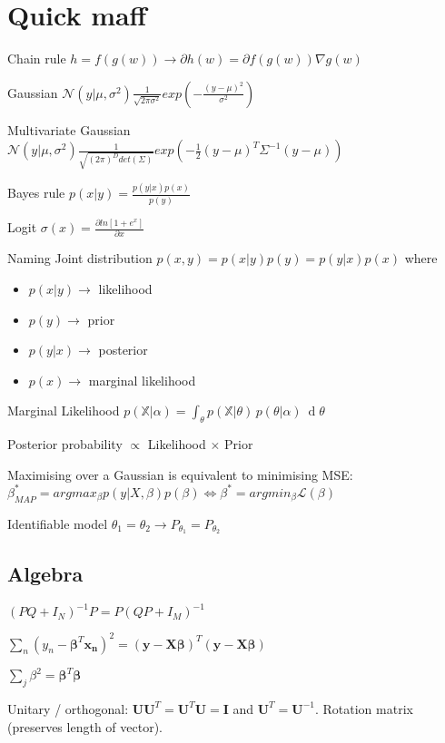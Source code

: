 \section{Quick maff}
Chain rule $h = f(g(w)) \rightarrow \partial h(w) = \partial f(g(w)) \nabla g(w)$

Gaussian $\mathcal{N}(y|\mu, \sigma^2) \frac{1}{\sqrt{2\pi \sigma^2}} exp(-\frac{(y-\mu)^2}{\sigma^2})$

Multivariate Gaussian $\mathcal{N}(y|\mu, \sigma^2) \frac{1}{\sqrt{(2\pi)^D det(\Sigma)}} exp(-\frac{1}{2} (y-\mu)^T \Sigma^{-1} (y-\mu))$

Bayes rule $p(x|y) = \frac{p(y|x) p(x)}{p(y)}$

Logit $\sigma(x) = \frac{\partial ln[1+e^x]}{\partial x}$

Naming
Joint distribution $p(x,y) = p(x|y)p(y)=p(y|x)p(x)$ where
\begin{itemize}
\item $p(x|y) \rightarrow$ likelihood 
\item $p(y) \rightarrow$ prior
\item $p(y|x) \rightarrow$ posterior
\item $p(x) \rightarrow$ marginal likelihood
\end{itemize}

Marginal Likelihood \newline $p({\mathbb  {X}}|\alpha )=\int _{\theta }p({\mathbb  {X}}|\theta )\,p(\theta |\alpha )\ \operatorname {d}\!\theta $

Posterior probability $\propto$ Likelihood $\times$ Prior

Maximising over a Gaussian is equivalent to minimising MSE: $\beta_{MAP}^* = arg max_{\beta} p(y|X,\beta)p(\beta) \Leftrightarrow \beta^* = arg min_{\beta} \mathcal{L}(\beta)$

Identifiable model $\theta_1 = \theta_2 \rightarrow P_{\theta_1} = P_{\theta_2}$

\subsection{Algebra}
$(PQ + I_N)^{-1} P = P (QP + I_M)^{-1}$

$\sum_n (y_{n} -\mathbf{\beta}^T\mathbf{x_n})^2 = (\mathbf{y} - \mathbf{X}\mathbf{\beta})^T(\mathbf{y} - \mathbf{X}\mathbf{\beta})$

$\sum_j \beta^2 = \mathbf{\beta}^T \mathbf{\beta}$

Unitary / orthogonal: $\mathbf{U}\mathbf{U}^T=\mathbf{U}^T\mathbf{U} = \mathbf{I}$ and $\mathbf{U}^T = \mathbf{U}^{-1}$. Rotation matrix (preserves length of vector).